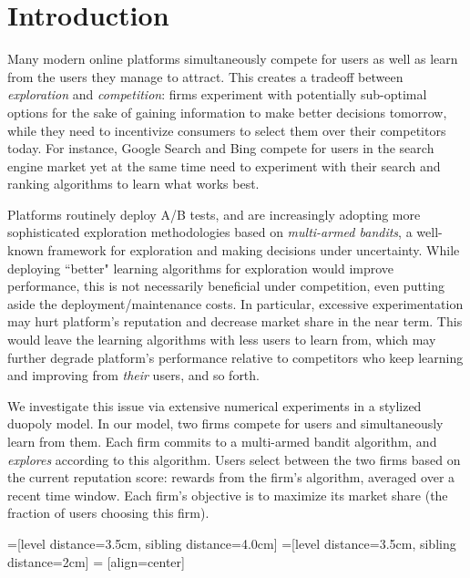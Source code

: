 \documentclass[../competing_bandits_with_appendix.tex]{subfiles}
\begin{document}
\section{Introduction}\label{section:1}

Many modern online platforms simultaneously compete for users as well as learn from the users they manage to attract. This creates a tradeoff between \textit{exploration} and \textit{competition}: firms experiment with potentially sub-optimal options for the sake of gaining information to make better decisions tomorrow, while they need to incentivize consumers to select them over their competitors today. For instance, Google Search and Bing compete for users in the search engine market yet at the same time need to experiment with their search and ranking algorithms to learn what works best.

Platforms routinely deploy A/B tests, and are increasingly adopting  more sophisticated exploration methodologies based on \emph{multi-armed bandits}, a well-known framework for exploration and making decisions under uncertainty. While deploying ``better" learning algorithms for exploration would improve performance, this is not necessarily beneficial under competition, even putting aside the deployment/maintenance costs. In particular, excessive experimentation may hurt platform's reputation and decrease market share in the near term. This would leave the learning algorithms with less users to learn from, which may further degrade platform's performance relative to competitors who keep learning and improving from \emph{their} users, and so forth.

 We investigate this issue via extensive numerical experiments in a stylized duopoly model. In our model, two firms compete for users and simultaneously learn from them. Each firm commits to a multi-armed bandit algorithm, and \emph{explores} according to this algorithm. Users select between the two firms based on the current reputation score: rewards from the firm's algorithm, averaged over a recent time window. Each firm's objective is to maximize its  market share (the fraction of users choosing this firm).

=[level distance=3.5cm, sibling distance=4.0cm]
=[level distance=3.5cm, sibling distance=2cm]
 = [align=center]
\end{document}
